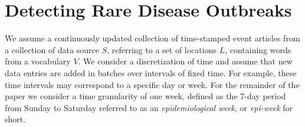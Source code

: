 \documentclass[conference]{IEEEtran}
\newcommand{\squishlist}{
   \begin{list}{$\bullet$}
    {
      \setlength{\itemsep}{0pt}
      \setlength{\parsep}{3pt}
      \setlength{\topsep}{3pt}
      \setlength{\partopsep}{0pt}
      \setlength{\leftmargin}{1.5em}
      \setlength{\labelwidth}{1em}
      \setlength{\labelsep}{0.5em} } }
\newcommand{\squishend}{
    \end{list}  }
\newcommand{\model}{{STAT}\xspace} %
\newcommand{\fullmodel}{{{\sf SourceMine}}\xspace}
\begin{document}
%
%
%

\section{Detecting Rare Disease Outbreaks}
\label{sec:problem}
We assume a continuously updated collection of time-stamped event articles from a collection of data source $S$, referring to a set of locations $L$, containing words from a vocabulary $V$. We consider a discretization of time and assume that new data entries are added in batches over intervals of fixed time. For example, these time intervals may correspond to a specific day or week. For the remainder of the paper we consider a time granularity of one week, defined as the 7-day period from Sunday to Saturday referred to as an {\em epidemiological week}, or {\em epi-week} for short. 
\end{document}
